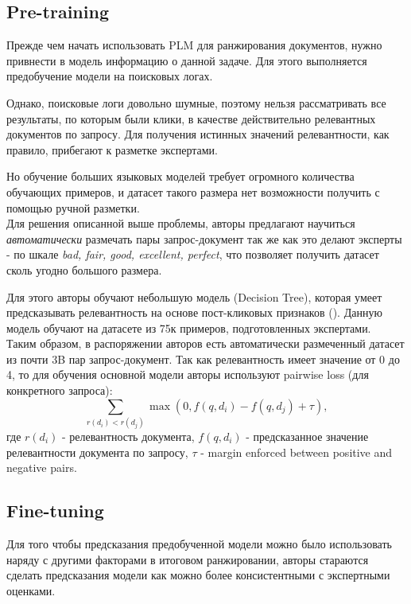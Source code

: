 \subsection*{Pre-training}

Прежде чем начать использовать PLM для ранжирования документов, нужно привнести в модель информацию о данной задаче.
Для этого выполняется предобучение модели на поисковых логах.

Однако, поисковые логи довольно шумные, поэтому нельзя рассматривать все результаты, по которым были клики, в качестве действительно релевантных документов по запросу.
Для получения истинных значений релевантности, как правило, прибегают к разметке экспертами.

Но обучение больших языковых моделей требует огромного количества обучающих примеров, и датасет такого размера нет возможности получить с помощью ручной разметки. \\

Для решения описанной выше проблемы, авторы предлагают научиться \textit{автоматически} размечать пары запрос-документ так же как это делают эксперты - по шкале \textit{bad, fair, good, excellent, perfect}, что позволяет получить датасет сколь угодно большого размера.

Для этого авторы обучают небольшую модель (Decision Tree), которая умеет предсказывать релевантность на основе пост-кликовых признаков ().
Данную модель обучают на датасете из 75к примеров, подготовленных экспертами. \\

Таким образом, в распоряжении авторов есть автоматически размеченный датасет из почти 3B пар запрос-документ.
Так как релевантность имеет значение от 0 до 4, то для обучения основной модели авторы используют pairwise loss (для конкретного запроса):
\begin{equation*}
    \sum\limits_{r(d_i) < r(d_j)} \max (0, f(q, d_i) - f(q, d_j) + \tau),
\end{equation*}
где $r(d_i)$ - релевантность документа, $f(q, d_i)$ - предсказанное значение релевантности документа по запросу, $\tau$ - margin enforced between positive and negative pairs.

\subsection*{Fine-tuning}

Для того чтобы предсказания предобученной модели можно было использовать наряду с другими факторами в итоговом ранжировании, авторы стараются сделать предсказания модели как можно более консистентными с экспертными оценками. \\

